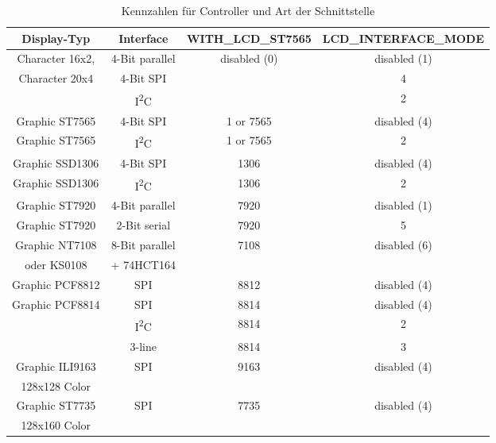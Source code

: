 \begin{description}
\begin{table}[H]
  \begin{center}
    \begin{tabular}{| c | c | c | c|}
    \hline
 Display-Typ        &  Interface     & WITH\_LCD\_ST7565 &  LCD\_INTERFACE\_MODE \\
    \hline
    \hline
  Character 16x2,   & 4-Bit parallel &  disabled (0)      & disabled (1) \\
  Character 20x4    &  4-Bit SPI     &                    &    4   \\
                  & I\textsuperscript{2}C &               &    2   \\
    \hline
  Graphic ST7565    & 4-Bit SPI      & 1 or 7565          & disabled (4) \\
    \hline
  Graphic ST7565  & I\textsuperscript{2}C & 1 or 7565     &   2 \\
    \hline
  Graphic SSD1306   & 4-Bit SPI      & 1306               & disabled (4) \\
    \hline
  Graphic SSD1306 & I\textsuperscript{2}C & 1306          &   2 \\
    \hline
  Graphic ST7920    & 4-Bit parallel  & 7920              & disabled (1) \\
    \hline
  Graphic ST7920    & 2-Bit serial    & 7920               &  5 \\
    \hline
  Graphic NT7108    & 8-Bit parallel  & 7108              & disabled (6) \\
  oder KS0108       &    + 74HCT164   &                   &      \\
    \hline
  Graphic PCF8812   & SPI             & 8812              & disabled (4) \\
    \hline
  Graphic PCF8814   & SPI             & 8814              & disabled (4) \\
                  & I\textsuperscript{2}C & 8814          &   2 \\
                    & 3-line          & 8814              &   3 \\
    \hline
  Graphic ILI9163   & SPI             & 9163              & disabled (4) \\
  128x128 Color     &                 &                   &              \\
    \hline
  Graphic ST7735    & SPI             & 7735              & disabled (4) \\
  128x160 Color     &                 &                   &              \\
    \hline
    \end{tabular}
  \end{center}
  \caption{Kennzahlen für Controller und  Art der Schnittstelle}
  \label{tab:cod-display}
\end{table}


\end{description}
